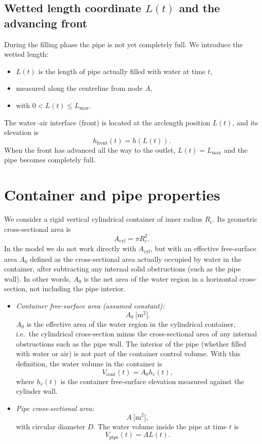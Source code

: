 \documentclass[11pt]{article}
\begin{document}
\subsection{Wetted length coordinate $L(t)$ and the advancing front}

During the filling phase the pipe is not yet completely full. We introduce the wetted length:
\begin{itemize}
  \item $L(t)$ is the length of pipe actually filled with water at time $t$,
  \item measured along the centreline from node $A$,
  \item with $0 < L(t) \le L_{\max}$.
\end{itemize}
The water--air interface (front) is located at the arclength position $L(t)$, and its elevation is
\[
  h_{\text{front}}(t) = h(L(t)).
\]
When the front has advanced all the way to the outlet, $L(t) = L_{\max}$ and the pipe becomes
completely full.

\section{Container and pipe properties}
\label{sec:container}

We consider a rigid vertical cylindrical container of inner radius $R_c$. Its geometric
cross-sectional area is
\[
  A_{\text{cyl}} = \pi R_c^2.
\]
In the model we do not work directly with $A_{\text{cyl}}$, but with an effective free-surface
area $A_0$ defined as the cross-sectional area actually occupied by water in the container,
after subtracting any internal solid obstructions (such as the pipe wall). In other words,
$A_0$ is the net area of the water region in a horizontal cross-section, not including the
pipe interior.

\begin{itemize}
  \item \emph{Container free-surface area (assumed constant):}
  \[
    A_0\ \text{[m$^2$]}.
  \]
  $A_0$ is the effective area of the water region in the cylindrical container, i.e.\ the
  cylindrical cross-section minus the cross-sectional area of any internal obstructions such
  as the pipe wall. The interior of the pipe (whether filled with water or air) is not part of
  the container control volume. With this definition, the water volume in the container is
  \[
    V_{\text{cont}}(t) = A_0 h_c(t),
  \]
  where $h_c(t)$ is the container free-surface elevation measured against the cylinder wall.
  \item \emph{Pipe cross-sectional area:}
  \[
    A\ \text{[m$^2$]},
  \]
  with circular diameter $D$. The water volume inside the pipe at time $t$ is
  \[
    V_{\text{pipe}}(t) = A L(t).
  \]
\end{itemize}
\end{document}

